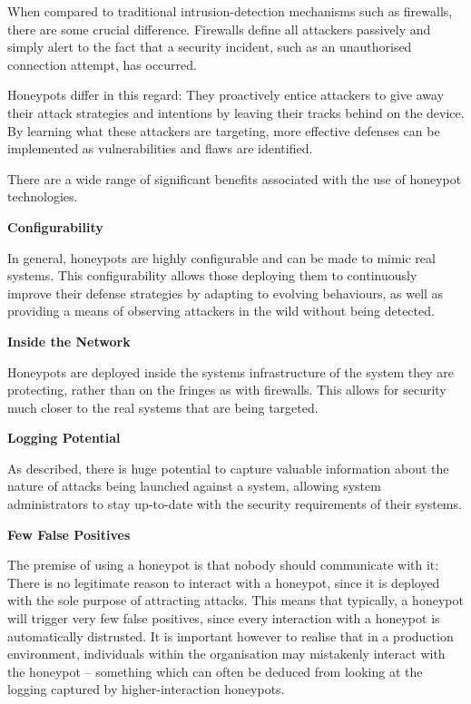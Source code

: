 When compared to traditional intrusion-detection mechanisms such as firewalls, there are some crucial difference. Firewalls define all attackers passively and simply alert to the fact that a security incident, such as an unauthorised connection attempt, has occurred. 

Honeypots differ in this regard: They proactively entice attackers to give away their attack strategies and intentions by leaving their tracks behind on the device. By learning what these attackers are targeting, more effective defenses can be implemented as vulnerabilities and flaws are identified.

There are a wide range of significant benefits associated with the use of honeypot technologies. 

\bullet \textbf{Configurability}

In general, honeypots are highly configurable and can be made to mimic real systems. This configurability allows those deploying them to continuously improve their defense strategies by adapting to evolving behaviours, as well as providing a means of observing attackers in the wild without being detected.

\bullet \textbf{Inside the Network} 

Honeypots are deployed inside the systems infrastructure of the system they are protecting, rather than on the fringes as with firewalls. This allows for security much closer to the real systems that are being targeted. 

\bullet \textbf{Logging Potential} 

As described, there is huge potential to capture valuable information about the nature of attacks being launched against a system, allowing system administrators to stay up-to-date with the security requirements of their systems.

\bullet \textbf{Few False Positives}

The premise of using a honeypot is that nobody should communicate with it: There is no legitimate reason to interact with a honeypot, since it is deployed with the sole purpose of attracting attacks. This means that typically, a honeypot will trigger very few false positives, since every interaction with a honeypot is automatically distrusted. It is important however to realise that in a production environment, individuals within the organisation may mistakenly interact with the honeypot – something which can often be deduced from looking at the logging captured by higher-interaction honeypots. 

